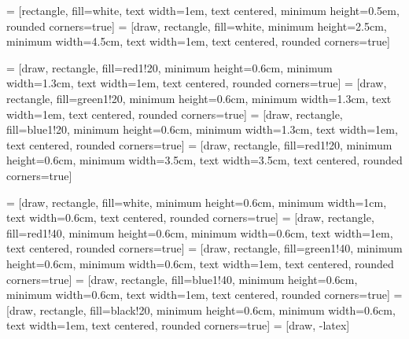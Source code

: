  = [rectangle, fill=white, text width=1em, text centered, minimum height=0.5em, rounded corners=true]
 = [draw, rectangle, fill=white, minimum height=2.5cm, minimum width=4.5cm, text width=1em, text centered, rounded corners=true]

 = [draw, rectangle, fill=red1!20, minimum height=0.6cm, minimum width=1.3cm, text width=1em, text centered, rounded corners=true]
 = [draw, rectangle, fill=green1!20, minimum height=0.6cm, minimum width=1.3cm, text width=1em, text centered, rounded corners=true]
 = [draw, rectangle, fill=blue1!20, minimum height=0.6cm, minimum width=1.3cm, text width=1em, text centered, rounded corners=true]
 = [draw, rectangle, fill=red1!20, minimum height=0.6cm, minimum width=3.5cm, text width=3.5cm, text centered, rounded corners=true]

 = [draw, rectangle, fill=white, minimum height=0.6cm, minimum width=1cm, text width=0.6cm, text centered, rounded corners=true]
 = [draw, rectangle, fill=red1!40, minimum height=0.6cm, minimum width=0.6cm, text width=1em, text centered, rounded corners=true]
 = [draw, rectangle, fill=green1!40, minimum height=0.6cm, minimum width=0.6cm, text width=1em, text centered, rounded corners=true]
 = [draw, rectangle, fill=blue1!40, minimum height=0.6cm, minimum width=0.6cm, text width=1em, text centered, rounded corners=true]
 = [draw, rectangle, fill=black!20, minimum height=0.6cm, minimum width=0.6cm, text width=1em, text centered, rounded corners=true]
 = [draw, -latex]



